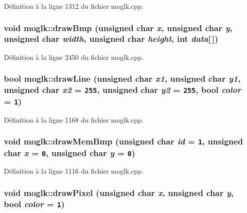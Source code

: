 Définition à la ligne 1312 du fichier moglk.cpp.\hypertarget{classmoglk_38ad099b570c6f81d9a5ae6251ae77d1}{
\subsubsection[{drawBmp}]{\setlength{\rightskip}{0pt plus 5cm}void moglk::drawBmp (unsigned char {\em x}, \/  unsigned char {\em y}, \/  unsigned char {\em width}, \/  unsigned char {\em height}, \/  int {\em data}\mbox{[}$\,$\mbox{]})}}
\label{classmoglk_38ad099b570c6f81d9a5ae6251ae77d1}




Définition à la ligne 2450 du fichier moglk.cpp.\hypertarget{classmoglk_d77d8ff35162a554708c3e93c37e0c7a}{
\subsubsection[{drawLine}]{\setlength{\rightskip}{0pt plus 5cm}bool moglk::drawLine (unsigned char {\em x1}, \/  unsigned char {\em y1}, \/  unsigned char {\em x2} = {\tt 255}, \/  unsigned char {\em y2} = {\tt 255}, \/  bool {\em color} = {\tt 1})}}
\label{classmoglk_d77d8ff35162a554708c3e93c37e0c7a}




Définition à la ligne 1168 du fichier moglk.cpp.\hypertarget{classmoglk_db45e510307e1c98467d4ee31cc845a6}{
\subsubsection[{drawMemBmp}]{\setlength{\rightskip}{0pt plus 5cm}void moglk::drawMemBmp (unsigned char {\em id} = {\tt 1}, \/  unsigned char {\em x} = {\tt 0}, \/  unsigned char {\em y} = {\tt 0})}}
\label{classmoglk_db45e510307e1c98467d4ee31cc845a6}




Définition à la ligne 1116 du fichier moglk.cpp.\hypertarget{classmoglk_903c108a85fd088ce9d0f2520773a781}{
\subsubsection[{drawPixel}]{\setlength{\rightskip}{0pt plus 5cm}void moglk::drawPixel (unsigned char {\em x}, \/  unsigned char {\em y}, \/  bool {\em color} = {\tt 1})}}
\label{classmoglk_903c108a85fd088ce9d0f2520773a781}




